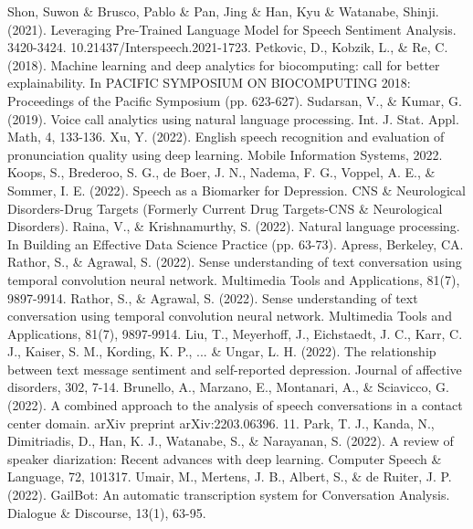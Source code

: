 \documentclass[conference]{IEEEtran}
\begin{document}
\begin{thebibliography}{00}
 Shon, Suwon \& Brusco, Pablo \& Pan, Jing \& Han, Kyu \& Watanabe, Shinji. (2021). Leveraging Pre-Trained Language Model for Speech Sentiment Analysis. 3420-3424. 10.21437/Interspeech.2021-1723.
 Petkovic, D., Kobzik, L., \& Re, C. (2018). Machine learning and deep analytics for biocomputing: call for better explainability. In PACIFIC SYMPOSIUM ON BIOCOMPUTING 2018: Proceedings of the Pacific Symposium (pp. 623-627).
 Sudarsan, V., \& Kumar, G. (2019). Voice call analytics using natural language processing. Int. J. Stat. Appl. Math, 4, 133-136.
 Xu, Y. (2022). English speech recognition and evaluation of pronunciation quality using deep learning. Mobile Information Systems, 2022.
 Koops, S., Brederoo, S. G., de Boer, J. N., Nadema, F. G., Voppel, A. E., \& Sommer, I. E. (2022). Speech as a Biomarker for Depression. CNS \& Neurological Disorders-Drug Targets (Formerly Current Drug Targets-CNS \& Neurological Disorders).
 Raina, V., \& Krishnamurthy, S. (2022). Natural language processing. In Building an Effective Data Science Practice (pp. 63-73). Apress, Berkeley, CA.
 Rathor, S., \& Agrawal, S. (2022). Sense understanding of text conversation using temporal convolution neural network. Multimedia Tools and Applications, 81(7), 9897-9914.
 Rathor, S., \& Agrawal, S. (2022). Sense understanding of text conversation using temporal convolution neural network. Multimedia Tools and Applications, 81(7), 9897-9914.
 Liu, T., Meyerhoff, J., Eichstaedt, J. C., Karr, C. J., Kaiser, S. M., Kording, K. P., ... \& Ungar, L. H. (2022). The relationship between text message sentiment and self-reported depression. Journal of affective disorders, 302, 7-14.
 Brunello, A., Marzano, E., Montanari, A., \& Sciavicco, G. (2022). A combined approach to the analysis of speech conversations in a contact center domain. arXiv preprint arXiv:2203.06396.
 11.	Park, T. J., Kanda, N., Dimitriadis, D., Han, K. J., Watanabe, S., \& Narayanan, S. (2022). A review of speaker diarization: Recent advances with deep learning. Computer Speech \& Language, 72, 101317.
 Umair, M., Mertens, J. B., Albert, S., \& de Ruiter, J. P. (2022). GailBot: An automatic transcription system for Conversation Analysis. Dialogue \& Discourse, 13(1), 63-95.
\end{thebibliography}
\vspace{12pt}
\end{document}
